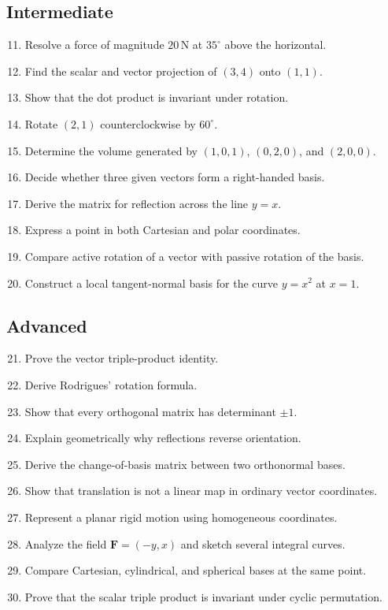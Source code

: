 \subsection*{Intermediate}
\begin{enumerate}
  \setcounter{enumi}{10}
  \item Resolve a force of magnitude $20\,\mathrm N$ at $35^\circ$ above the horizontal.
  \item Find the scalar and vector projection of $(3,4)$ onto $(1,1)$.
  \item Show that the dot product is invariant under rotation.
  \item Rotate $(2,1)$ counterclockwise by $60^\circ$.
  \item Determine the volume generated by $(1,0,1)$, $(0,2,0)$, and $(2,0,0)$.
  \item Decide whether three given vectors form a right-handed basis.
  \item Derive the matrix for reflection across the line $y=x$.
  \item Express a point in both Cartesian and polar coordinates.
  \item Compare active rotation of a vector with passive rotation of the basis.
  \item Construct a local tangent-normal basis for the curve $y=x^2$ at $x=1$.
\end{enumerate}

\subsection*{Advanced}
\begin{enumerate}
  \setcounter{enumi}{20}
  \item Prove the vector triple-product identity.
  \item Derive Rodrigues' rotation formula.
  \item Show that every orthogonal matrix has determinant $\pm1$.
  \item Explain geometrically why reflections reverse orientation.
  \item Derive the change-of-basis matrix between two orthonormal bases.
  \item Show that translation is not a linear map in ordinary vector coordinates.
  \item Represent a planar rigid motion using homogeneous coordinates.
  \item Analyze the field $\mathbf F=(-y,x)$ and sketch several integral curves.
  \item Compare Cartesian, cylindrical, and spherical bases at the same point.
  \item Prove that the scalar triple product is invariant under cyclic permutation.
\end{enumerate}
